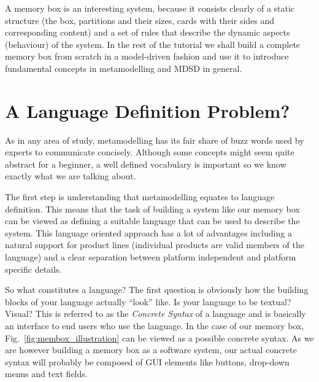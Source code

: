 A memory box is an interesting system, because it consists clearly of a static
structure (the box, partitions and their sizes, cards with their sides and
corresponding content) and a set of rules that describe the dynamic aspects 
(behaviour) of the system.  In the rest of the tutorial we shall build a
complete memory box from scratch in a model-driven fashion and use it to
introduce fundamental concepts in metamodelling and MDSD in general.  

\section{A Language Definition Problem?}

As in any area of study, metamodelling has its fair share of buzz words used
by experts to communicate concisely.  Although some concepts might seem quite
abstract for a beginner, a well defined vocabulary is important so we know
exactly what we are talking about.   

The first step is understanding that metamodelling equates to language
definition.  This means that the task of building a system like our memory box
can be viewed as defining a suitable language that can be used to describe the
system.  This language oriented approach has a lot of advantages including a
natural support for product lines (individual products are valid members of the
language) and a clear separation between platform independent and platform
specific details.      

So what constitutes a language?  The first question is obviously  how the
building blocks of your language actually ``look'' like.  Is your language to be
textual?  Visual?  This is referred to as the \emph{Concrete Syntax} of a
language and is basically an interface to end users who use the language.  
In the case of our memory box, Fig.~\ref{fig:membox_illustration} can be viewed
as a possible concrete syntax.  As we are however building a memory box as a
software system, our actual concrete syntax  will probably be composed of GUI
elements like buttons, drop-down menus and text fields.   

